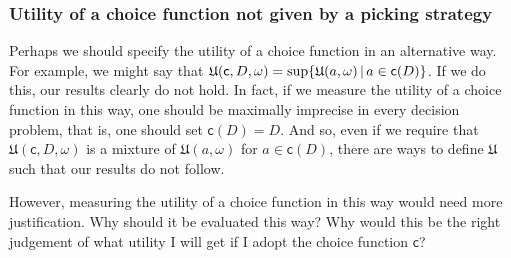 \documentclass[a4paper,final]{article}
\newcommand\U{\mathfrak{U}} %
\renewcommand\c{\mathsf{c}} %
\newcommand{\todoold}[2][]{\todo[backgroundcolor=white,bordercolor=orange!10,linecolor=gray!10, #1,caption={},textcolor=gray]{Pre-rev: #2}}
\newcommand\SetDelimiter[1][]{
	\nonscript\,#1\vert \allowbreak \nonscript\,\mathopen{}}
\providecommand\given{\SetDelimiter}
\newenvironment{CCM rewritten}
{\begingroup\color{blue}} %
{\endgroup}              %
\begin{document}
%
%
%
%
\subsubsection{Utility of a choice function not given by a picking strategy}

Perhaps we should specify the utility of a choice function in an alternative way. %
For example, we might say that $\U(\c,D,\omega)=\sup\{\U(a,\omega)\given a\in \c(D)\}$. If we do this, our results clearly do not hold. In fact, if we measure the utility of a choice function in this way, one should be maximally imprecise in every decision problem, that is, one should set $\c(D)=D$. And so, even if we require that $\U(\c,D,\omega)$ is a mixture of $\U(a,\omega)$ for $a\in\c(D)$, there are ways to define $\U$ such that our results do not follow. 

However, measuring the utility of a choice function in this way would need more justification. Why should it be evaluated this way?
Why would this be the right judgement of what utility I will get if I adopt the choice function $\c$?
\end{document}
